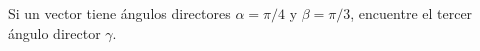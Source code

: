 \item Si un vector tiene ángulos directores $\alpha = \pi/4$ y $\beta = \pi/3$, encuentre el tercer ángulo director $\gamma$.
